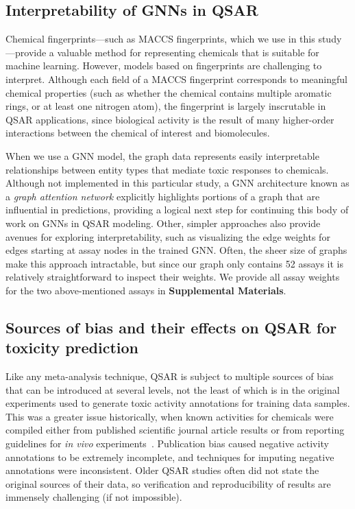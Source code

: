 \documentclass{ws-procs11x85}
\begin{document}
\subsection{Interpretability of GNNs in QSAR}
Chemical fingerprints---such as MACCS fingerprints, which we use in this study---provide a valuable method for representing chemicals that is suitable for machine learning.
However, models based on fingerprints are challenging to interpret.
Although each field of a MACCS fingerprint corresponds to meaningful chemical properties (such as whether the chemical contains multiple aromatic rings, or at least one nitrogen atom), the fingerprint is largely inscrutable in QSAR applications, since biological activity is the result of many higher-order interactions between the chemical of interest and biomolecules.

When we use a GNN model, the graph data represents easily interpretable relationships between entity types that mediate toxic responses to chemicals.
Although not implemented in this particular study, a GNN architecture known as a \textit{graph attention network} explicitly highlights portions of a graph that are influential in predictions, providing a logical next step for continuing this body of work on GNNs in QSAR modeling.
Other, simpler approaches also provide avenues for exploring interpretability, such as visualizing the edge weights for edges starting at assay nodes in the trained GNN.
Often, the sheer size of graphs make this approach intractable, but since our graph only contains 52 assays it is relatively straightforward to inspect their weights. We provide all assay weights for the two above-mentioned assays in \textbf{Supplemental Materials}.

\subsection{Sources of bias and their effects on QSAR for toxicity prediction}
Like any meta-analysis technique, QSAR is subject to multiple sources of bias that can be introduced at several levels, not the least of which is in the original experiments used to generate toxic activity annotations for training data samples.
This was a greater issue historically, when known activities for chemicals were compiled either from published scientific journal article results or from reporting guidelines for \textit{in vivo} experiments~\cite{cronin2019identification}.
Publication bias caused negative activity annotations to be extremely incomplete, and techniques for imputing negative annotations were inconsistent.
Older QSAR studies often did not state the original sources of their data, so verification and reproducibility of results are immensely challenging (if not impossible).
\end{document}
